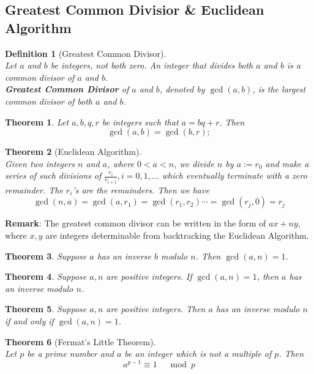 \documentclass[12pt]{article}
\newtheorem{definition}{Definition}[section]
\newtheorem{theorem}{Theorem}[section]
\theoremstyle{definition}
\begin{document}
\subsection{Greatest Common Divisior \& Euclidean Algorithm}
\begin{definition}[Greatest Common Divisor]
\hfill\\\normalfont Let $a$ and $b$ be integers, not both zero. An integer that divides both $a$ and $b$ is a common divisor of $a$ and $b$.\\\textbf{Greatest Common Divisor} of $a$ and $b$, denoted by $\gcd(a,b)$, is the largest common divisor of both $a$ and $b$.
\end{definition}
\begin{theorem}\normalfont Let $a,b,q,r$ be integers such that $a=bq+r$. Then
\[
\gcd(a,b)=\gcd(b,r);
\]
\end{theorem}
\begin{theorem}[Euclidean Algorithm]
\hfill\\\normalfont Given two integers $n$ and $a$, where $0<a<n$, we divide $n$ by $a:=r_0$ and make a series of such divisions of $\frac{r_i}{r_{i+1}}, i=0,1,\ldots$ which eventually terminate with a zero remainder. The $r_i$'s are the remainders. Then we have
\[
\gcd(n,a)=\gcd(a,r_1)=\gcd(r_1,r_2)\cdots=\gcd(r_j, 0)=r_j
\]
\end{theorem}
\textbf{Remark}: The greatest common divisor can be written in the form of $ax+ny$, where $x,y$ are integers determinable from backtracking the Euclidean Algorithm.
\begin{theorem}\normalfont Suppose $a$ has an inverse $b$ modulo $n$. Then $\gcd(a,n)=1$.
\end{theorem}
\begin{theorem}\normalfont Suppose $a,n$ are positive integers. If $\gcd(a,n)=1$, then $a$ has an inverse modulo $n$.
\end{theorem}
\begin{theorem}\normalfont Suppose $a,n$ are positive integers. Then $a$ has an inverse modulo $n$ if and only if $\gcd(a,n)=1$.\end{theorem}
\begin{theorem}[Fermat's Little Theorem]\hfill\\\normalfont Let $p$ be a prime number and $a$ be an integer which is not a multiple of $p$. Then
\[
a^{p-1}\equiv 1\;\;\;\mod p
\]
\end{theorem}
\end{document}
